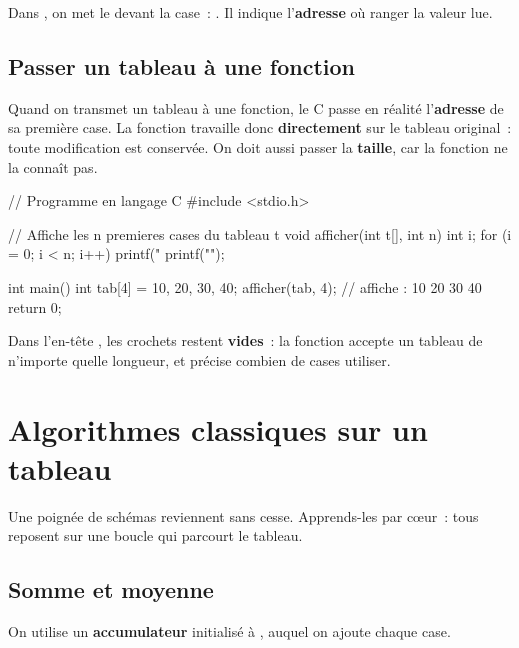 
\begin{attention}
Dans , on met le \code{\&} devant la case~: .
Il indique l'\textbf{adresse} où ranger la valeur lue.
\end{attention}

\subsection{Passer un tableau à une fonction}

Quand on transmet un tableau à une fonction, le C passe en réalité l'\textbf{adresse}
de sa première case. La fonction travaille donc \textbf{directement} sur le tableau
original~: toute modification est conservée. On doit aussi passer la \textbf{taille},
car la fonction ne la connaît pas.

\begin{codec}
// Programme en langage C
#include <stdio.h>

// Affiche les n premieres cases du tableau t
void afficher(int t[], int n) {
    int i;
    for (i = 0; i < n; i++) {
        printf("%
    }
    printf("\n");
}

int main() {
    int tab[4] = {10, 20, 30, 40};
    afficher(tab, 4);     // affiche : 10 20 30 40
    return 0;
}
\end{codec}

\begin{remarque}
Dans l'en-tête , les crochets \code{[]} restent
\textbf{vides}~: la fonction accepte un tableau de n'importe quelle longueur, et
 précise combien de cases utiliser.
\end{remarque}

\section{Algorithmes classiques sur un tableau}

Une poignée de schémas reviennent sans cesse. Apprends-les par cœur~: tous reposent
sur une boucle qui parcourt le tableau.

\subsection{Somme et moyenne}

On utilise un \textbf{accumulateur} initialisé à , auquel on ajoute chaque
case.

